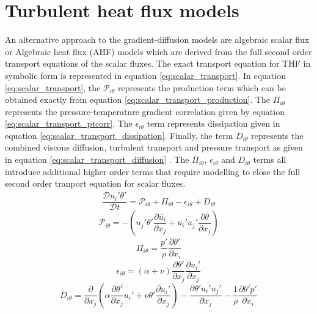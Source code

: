 \section{Turbulent heat flux models}

An alternative approach to the gradient-diffusion models are algebraic scalar flux or Algebraic heat flux (AHF) models which are derived from the full second order transport equations of the scalar fluxes. The exact transport equation for THF in symbolic form is represented in equation \ref{eq:scalar_transport}. In equation \ref{eq:scalar_transport}, the $\mathcal{P}_{i\theta}$ represents the production term which can be obtained exactly from equation \ref{eq:scalar_transport_production}. The $\Pi_{i\theta}$ represents the pressure-temperature gradient correlation given by equation \ref{eq:scalar_transport_ptcorr}. The $\epsilon_{i\theta}$ term represents dissipation given in equation \ref{eq:scalar_transport_dissipation}. Finally, the term $D_{i\theta}$ represents the combined viscous diffusion, turbulent transport and pressure transport as given in equation \ref{eq:scalar_transport_diffusion} \cite{Qiu2008}. The $\Pi_{i\theta}$, $\epsilon_{i\theta}$ and $D_{i\theta}$ terms all introduce additional higher order terms that require modelling to close the full second order tranport equation for scalar fluxes. 
\begin{equation}
\label{eq:scalar_transport}
\frac{\mathcal{D}\overline{u_{i}'\theta'}}{\mathcal{D}t} = \mathcal{P}_{i\theta} + \Pi_{i\theta} - \epsilon_{i\theta} + D_{i\theta}
\end{equation}
\begin{equation}
\label{eq:scalar_transport_production}
\mathcal{P}_{i\theta} = -\left(\overline{u_{j}'\theta'}\frac{\partial \overline{u_{i}}}{\partial x_{j}} + \overline{u_{i}'u_{j}'}\frac{\partial \overline{\theta}}{\partial x_{j}}\right)
\end{equation}
\begin{equation}
\label{eq:scalar_transport_ptcorr}
\Pi_{i\theta} = \overline{\frac{p'}{\rho}\frac{\partial \theta'}{\partial x_{i}}}
\end{equation}
\begin{equation}
\label{eq:scalar_transport_dissipation}
\epsilon_{i\theta} = (\alpha + \nu)\overline{\frac{\partial \theta'}{\partial x_{j}} \frac{\partial u_{i}'}{\partial x_{j}}}
\end{equation}
\begin{equation}
\label{eq:scalar_transport_diffusion}
D_{i\theta} = \frac{\partial}{\partial x_{j}}\left(\alpha\overline{\frac{\partial \theta'}{\partial x_{j}}u_{i}'} + \nu\overline{\theta'\frac{\partial u_{i}'}{\partial x_{j}}} \right) - \frac{\partial \overline{\theta'u_{i}'u_{j}'}}{\partial x_{j}} - \frac{1}{\rho}\frac{\partial \overline{\theta'p'}}{\partial x_{i}}
\end{equation}
